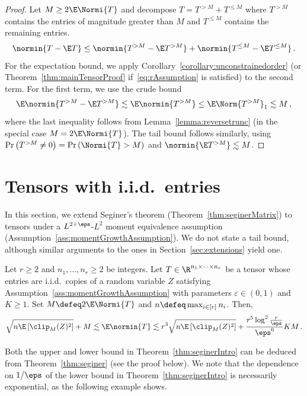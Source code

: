 \documentclass[11pt,a4paper]{article}
\begin{document}
\begin{proof}
    Let $M\ge 2 \E \Normi{T}$ and decompose $T = T^{>M} + T^{\le M} $ where $T^{>M}$ contains the entries of magnitude greater than $M$ and $T^{\le M}$ contains the remaining entries.
    \[
        \normin{T- \E T} \leq  \normin{T^{>M} - \E T^{>M}} + \normin{T^{\le M} - \E T^{\le M}}\,.
    \]
    For the expectation bound, we apply Corollary~\ref{corollary:unconstrainedorder} (or Theorem~\ref{thm:mainTensorProof} if~\eqref{eq:rAssumption} is satisfied) to the second term.
    For the first term, we use the
    crude bound
    \[
        \E \normin{T^{>M} - \E T^{>M}}\lesssim  \E \normin{T^{>M}} \le \E \Norm{T^{>M}}_1\lesssim M\,,
    \]
    where the last inequality
    follows from Lemma~\ref{lemma:reversetrunc} (in the special case $M = 2 \E \Normi{T}$). The tail bound follows similarly,
    using $\Pr\left( T^{> M} \neq 0\right) = \Pr\left( \Normi{T} > M\right)$ and $\normin{ \E T^{> M}} \lesssim M $.
\end{proof}

\section{Tensors with i.i.d.\ entries}
\label{sec:seginer}

In this section, we extend Seginer's theorem (Theorem~\ref{thm:seginerMatrix}) to tensors under a $L^{2+\eps}$-$L^2$ moment equivalence assumption (Assumption~\ref{ass:momentGrowthAssumption}).  
We do not state a tail bound, although similar arguments to the ones in Section~\ref{sec:extensions} yield one. 

\begin{theorem}\label{thm:seginer}
    Let $r\ge 2$ and $n_1, \ldots, n_r\ge 2$ be integers. Let $T \in \R^{n_1 \times \cdots \times n_r}$ be a tensor whose entries are i.i.d.\ copies of a random variable $Z$
    satisfying Assumption~\ref{ass:momentGrowthAssumption} with parameters $\varepsilon\in (0,1)$ and $K\ge 1$.
    Set $M \defeq 2\E \Normi{T}$ and $n \defeq \max_{i\in [r]} n_i$. Then,
    \[
        \sqrt{n \E\left[\clip_M(Z)^2\right]} + M \lesssim \E \normin{T} \lesssim r^3\sqrt{n \E\left[\clip_M(Z)^2\right]} + \frac{r^5 \log^2 \frac {r} \eps }{ \eps^{6} } KM \,.
    \]
\end{theorem}

Both the upper and lower bound in Theorem~\ref{thm:seginerIntro} can be deduced from Theorem~\ref{thm:seginer} (see the proof below). We note that
the dependence on $1/\eps$ of the lower bound
in Theorem~\ref{thm:seginerIntro} is necessarily
exponential, as the following example shows.
\end{document}
